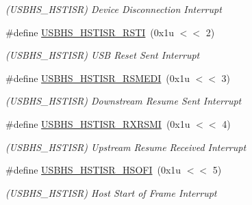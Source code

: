 \begin{DoxyCompactItemize}
\begin{DoxyCompactList}\small\item\em (U\+S\+B\+H\+S\+\_\+\+H\+S\+T\+I\+SR) Device Disconnection Interrupt \end{DoxyCompactList}\item 
\mbox{\label{group__SAME70__USBHS_gaf84113b919c558bfeb00a82f0b34ceaa}} 
\#define \mbox{\hyperlink{group__SAME70__USBHS_gaf84113b919c558bfeb00a82f0b34ceaa}{U\+S\+B\+H\+S\+\_\+\+H\+S\+T\+I\+S\+R\+\_\+\+R\+S\+TI}}~(0x1u $<$$<$ 2)
\begin{DoxyCompactList}\small\item\em (U\+S\+B\+H\+S\+\_\+\+H\+S\+T\+I\+SR) U\+SB Reset Sent Interrupt \end{DoxyCompactList}\item 
\mbox{\label{group__SAME70__USBHS_ga09c9fce8f7ee07463c038713026e71a3}} 
\#define \mbox{\hyperlink{group__SAME70__USBHS_ga09c9fce8f7ee07463c038713026e71a3}{U\+S\+B\+H\+S\+\_\+\+H\+S\+T\+I\+S\+R\+\_\+\+R\+S\+M\+E\+DI}}~(0x1u $<$$<$ 3)
\begin{DoxyCompactList}\small\item\em (U\+S\+B\+H\+S\+\_\+\+H\+S\+T\+I\+SR) Downstream Resume Sent Interrupt \end{DoxyCompactList}\item 
\mbox{\label{group__SAME70__USBHS_gab6e204fe65d4c73c987271638fcdfdb6}} 
\#define \mbox{\hyperlink{group__SAME70__USBHS_gab6e204fe65d4c73c987271638fcdfdb6}{U\+S\+B\+H\+S\+\_\+\+H\+S\+T\+I\+S\+R\+\_\+\+R\+X\+R\+S\+MI}}~(0x1u $<$$<$ 4)
\begin{DoxyCompactList}\small\item\em (U\+S\+B\+H\+S\+\_\+\+H\+S\+T\+I\+SR) Upstream Resume Received Interrupt \end{DoxyCompactList}\item 
\mbox{\label{group__SAME70__USBHS_ga2e72394c9c97ef664be053cbd2c76bc5}} 
\#define \mbox{\hyperlink{group__SAME70__USBHS_ga2e72394c9c97ef664be053cbd2c76bc5}{U\+S\+B\+H\+S\+\_\+\+H\+S\+T\+I\+S\+R\+\_\+\+H\+S\+O\+FI}}~(0x1u $<$$<$ 5)
\begin{DoxyCompactList}\small\item\em (U\+S\+B\+H\+S\+\_\+\+H\+S\+T\+I\+SR) Host Start of Frame Interrupt \end{DoxyCompactList}\item 

\end{DoxyCompactItemize}
